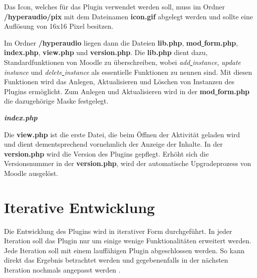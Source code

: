 Das Icon, welches für das Plugin  verwendet werden soll, muss im Ordner \textbf{/hyperaudio/pix} mit dem Dateinamen \textbf{icon.gif} abgelegt werden und sollte eine Auflösung von 16x16 Pixel besitzen.

Im Ordner \textbf{/hyperaudio} liegen dann die Dateien \textbf{lib.php}, \textbf{mod\underline{{ }}form.php}, \textbf{index.php}, \textbf{view.php} und \textbf{version.php}. Die \textbf{lib.php} dient dazu, Standardfunktionen von Moodle zu überschreiben, wobei \textit{add\underline{{ }}instance}, \textit{update\underline{{ }}instance} und \textit{delete\underline{{ }}instance} als essentielle Funktionen zu nennen sind. Mit diesen Funktionen wird das Anlegen, Aktualisieren und Löschen von Instanzen des Plugins ermöglicht. Zum Anlegen und Aktualisieren wird in der \textbf{mod\underline{{ }}form.php} die dazugehörige Maske festgelegt.


\textbf{\textit{index.php}}


Die \textbf{view.php} ist die erste Datei, die beim Öffnen der Aktivität geladen wird und dient dementsprechend vornehmlich der Anzeige der Inhalte. In der \textbf{version.php} wird die Version des Plugins gepflegt. Erhöht sich die Versionsnummer in der \textbf{version.php}, wird der automatische Upgradeprozess von Moodle ausgelöst.


\section{Iterative Entwicklung}
Die Entwicklung des Plugins wird in iterativer Form durchgeführt. In jeder Iteration soll das Plugin nur um einige wenige Funktionalitäten erweitert werden. Jede Iteration soll mit einem lauffähigen Plugin abgeschlossen werden. So kann direkt das Ergebnis betrachtet werden und gegebenenfalls in der nächsten Iteration nochmals angepasst werden \citep{augsten2018iterativ}.


